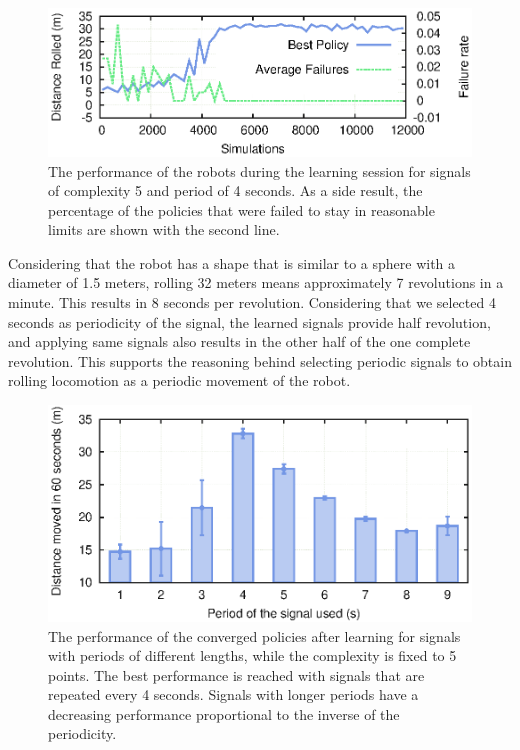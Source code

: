 \documentclass[twocolumn,10pt]{asme2ej}
\begin{document}
\begin{figure}[t]
\centering
\includegraphics[width=\columnwidth]{results/failures/learningVsFailures.eps}
\caption{The performance of the robots during the learning session for signals of complexity 5 and period of 4 seconds. As a side result, the percentage of the policies that were failed to stay in reasonable limits are shown with the second line. }
\label{fig:learning}
\end{figure}

Considering that the robot has a shape that is similar to a sphere with a diameter of 1.5 meters, rolling 32 meters  means  approximately 7 revolutions in a minute. This results in 8 seconds per revolution. Considering that we selected 4 seconds as periodicity of the signal, the learned signals  provide half revolution, and applying same signals also results in the other half of the one complete revolution.  This supports the reasoning behind selecting periodic signals to obtain rolling locomotion as a periodic movement of the robot.

\begin{figure}[t]
\centering
\includegraphics[width=\columnwidth]{results/period/period.eps}
\caption{The performance of the converged policies after learning for signals with periods of different lengths, while the complexity is fixed to 5 points. The best performance is reached with signals that are repeated every 4 seconds. Signals with longer periods have a decreasing performance proportional to the inverse of the periodicity.}
\label{fig:period}
\end{figure}
\end{document}
